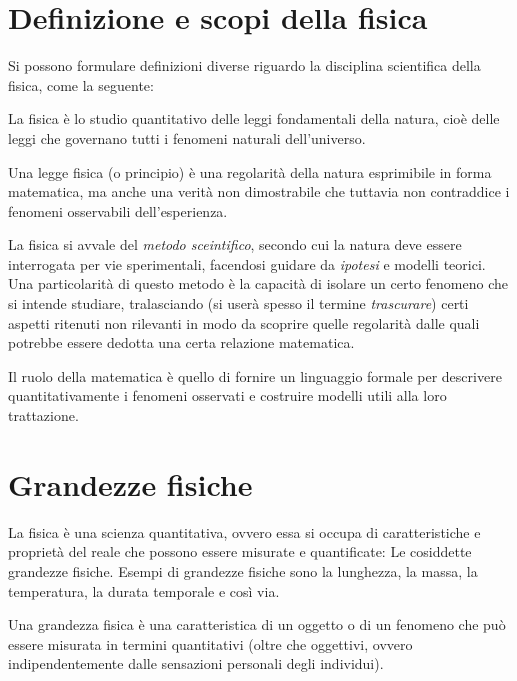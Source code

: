 \marginpar{\minitoc}

\section{Definizione e scopi della fisica}

Si possono formulare definizioni diverse riguardo la disciplina scientifica
della fisica, come la seguente:

\vspace{8pt}
\begin{tcolorbox}[colback = yellow!30, colframe = yellow!30!black, title = {Fisica}]
La fisica è lo studio quantitativo delle leggi fondamentali della natura, cioè
delle leggi che governano tutti i fenomeni naturali dell'universo.

Una legge fisica (o principio) è una regolarità della natura esprimibile in forma
matematica, ma anche una verità non dimostrabile che tuttavia non contraddice i
fenomeni osservabili dell'esperienza.
\end{tcolorbox}
\vspace{5pt}

\noindent La fisica si avvale del \textit{metodo sceintifico}, secondo cui la natura deve
essere interrogata per vie sperimentali, facendosi guidare da \textit{ipotesi} e
modelli teorici. Una particolarità di questo metodo è la capacità di isolare
un certo fenomeno che si intende studiare, tralasciando (si userà spesso il
termine \textit{trascurare}) certi aspetti ritenuti non rilevanti in modo da
scoprire quelle regolarità dalle quali potrebbe essere dedotta una certa
relazione matematica.

Il ruolo della matematica è quello di fornire un linguaggio formale per descrivere
quantitativamente i fenomeni osservati e costruire modelli utili alla loro
trattazione.



\section{Grandezze fisiche}
La fisica è una scienza quantitativa, ovvero essa si occupa di caratteristiche
e proprietà del reale che possono essere misurate e quantificate: Le cosiddette
grandezze fisiche. Esempi di grandezze fisiche sono la lunghezza, la massa, la
temperatura, la durata temporale e così via.

\vspace{8pt}
\begin{tcolorbox}[colback = yellow!30, colframe = yellow!30!black, title = {Grandezza fisica}]
Una grandezza fisica è una caratteristica di un oggetto o di un fenomeno che può
essere misurata in termini quantitativi (oltre che oggettivi, ovvero indipendentemente
dalle sensazioni personali degli individui).
\end{tcolorbox}
\vspace{5pt}

